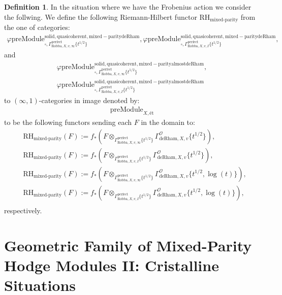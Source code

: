 \documentclass[12pt]{book}
\theoremstyle{definition}
\newtheorem{definition}{Definition}
\begin{document}
\begin{definition}
In the situation where we have the Frobenius action we consider the follwing. We define the following Riemann-Hilbert functor $\text{RH}_\text{mixed-parity}$ from the one of categories:
\begin{align}
\varphi\mathrm{preModule}^\mathrm{solid,quasicoherent,mixed-paritydeRham}_{\square,\Gamma^\mathrm{perfect}_{\text{Robba},X,v,\infty}\{t^{1/2}\}},
\varphi\mathrm{preModule}^\mathrm{solid,quasicoherent,mixed-paritydeRham}_{\square,\Gamma^\mathrm{perfect}_{\text{Robba},X,v,I}\{t^{1/2}\}}, 
\end{align}
and
\begin{align}
\varphi\mathrm{preModule}^\mathrm{solid,quasicoherent,mixed-parityalmostdeRham}_{\square,\Gamma^\mathrm{perfect}_{\text{Robba},X,v,\infty}\{t^{1/2}\}},\\
\varphi\mathrm{preModule}^\mathrm{solid,quasicoherent,mixed-parityalmostdeRham}_{\square,\Gamma^\mathrm{perfect}_{\text{Robba},X,v,I}\{t^{1/2}\}} 
\end{align}
to $(\infty,1)$-categories in image denoted by:
\begin{align}
\mathrm{preModule}_{X,\text{\'et}}
\end{align}
to be the following functors sending each $F$ in the domain to:
\begin{align}
&\text{RH}_\text{mixed-parity}(F):=f_*(F\otimes_{\Gamma^\mathrm{perfect}_{\text{Robba},X,v,\infty}\{t^{1/2}\}} \Gamma^\mathcal{O}_{\text{deRham},X,v}\{t^{1/2}\}),\\
&\text{RH}_\text{mixed-parity}(F):=f_*(F\otimes_{\Gamma^\mathrm{perfect}_{\text{Robba},X,v,I}\{t^{1/2}\}} \Gamma^\mathcal{O}_{\text{deRham},X,v}\{t^{1/2}\}),\\
&\text{RH}_\text{mixed-parity}(F):=f_*(F\otimes_{\Gamma^\mathrm{perfect}_{\text{Robba},X,v,\infty}\{t^{1/2}\}} \Gamma^\mathcal{O}_{\text{deRham},X,v}\{t^{1/2},\log(t)\}),\\
&\text{RH}_\text{mixed-parity}(F):=f_*(F\otimes_{\Gamma^\mathrm{perfect}_{\text{Robba},X,v,I}\{t^{1/2}\}} \Gamma^\mathcal{O}_{\text{deRham},X,v}\{t^{1/2},\log(t)\}),\\
\end{align}
respectively.

\end{definition}


\newpage
\section{Geometric Family of Mixed-Parity Hodge Modules II: Cristalline Situations}
\end{document}
